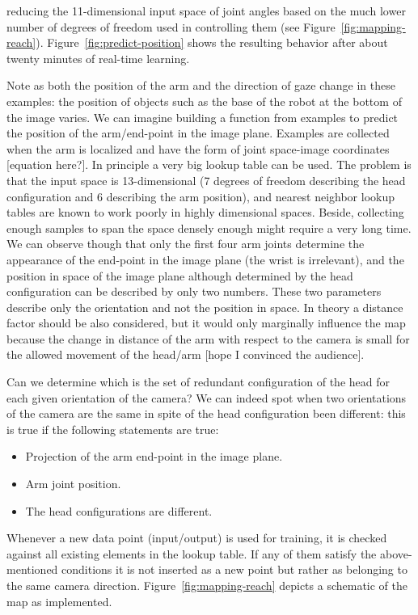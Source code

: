 \ifverbose
reducing the 11-dimensional input space of joint angles based on 
the much lower number of degrees of freedom used in controlling them
(see Figure~\ref{fig:mapping-reach}).
Figure~\ref{fig:predict-position} shows the resulting behavior
after about twenty minutes of real-time learning. 
\fi

%
\ifverbose
Note as both the
position of the arm and the direction of gaze change in these
examples: the position of objects such as the base of the robot at the
bottom of the image varies.
\fi
%
\ifverbose
We can imagine building a function from examples to predict the
position of the arm/end-point in the image plane. Examples are
collected when the arm is localized and have the form of joint
space-image coordinates [equation here?]. In principle a very big
lookup table can be used. The problem is that the input space is
13-dimensional (7 degrees of freedom describing the head configuration
and 6 describing the arm position), and nearest neighbor lookup tables
are known to work poorly in highly dimensional spaces. Beside,
collecting enough samples to span the space densely enough might
require a very long time. We can observe though that only the first
four arm joints determine the appearance of the end-point in the image
plane (the wrist is irrelevant), and the position in space of the
image plane although determined by the head configuration can be
described by only two numbers. These two parameters describe only the
orientation and not the position in space. In theory a distance factor
should be also considered, but it would only marginally influence the
map because the change in distance of the arm with respect to the
camera is small for the allowed movement of the head/arm [hope I
convinced the audience].
\fi


\ifverbose
Can we determine which is the set of redundant configuration of the
head for each given orientation of the camera? We can indeed spot when
two orientations of the camera are the same in spite of the head
configuration been different: this is true if the following statements
are true:
%
\begin{itemize}
%
\item Projection of the arm end-point in the image plane.
%
\item Arm joint position.
%
\item The head configurations are different.
%
\end{itemize}
%
Whenever a new data point (input/output) is used for training, it is
checked against all existing elements in the lookup table. If any of
them satisfy the above-mentioned conditions it is not inserted as a
new point but rather as belonging to the same camera direction.
Figure~\ref{fig:mapping-reach} depicts a schematic of the map as
implemented.

